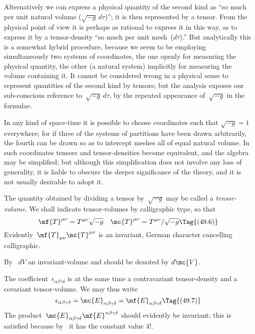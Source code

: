 \documentclass[12pt]{book}
\begin{document}
Alternatively we can express a physical quantity of the second kind as
``so much per unit natural volume ($\sqrt{-g}\, d\tau$)''; it is then represented by a
tensor. From the physical point of view it is perhaps as rational to express
it in this way, as to express it by a tensor\hyp{}density ``so much per unit mesh~($d\tau$).''
But analytically this is a somewhat hybrid procedure, because we seem
to be employing simultaneously two systems of coordinates, the one openly
for measuring the physical quantity, the other (a natural system) implicitly
for measuring the volume containing it. It cannot be considered wrong in a
physical sense to represent quantities of the second kind by tensors; but the
analysis exposes our sub-conscious reference to~$\sqrt{-g}\, d\tau$, by the repeated
appearance of~$\sqrt{-g}$ in the formulae.

In any kind of space-time it is possible to choose coordinates such that
$\sqrt{-g} = 1$ everywhere; for if three of the systems of partitions have been
drawn arbitrarily, the fourth can be drawn so as to intercept meshes all of
equal natural volume. In such coordinates tensors and tensor\hyp{}densities become
equivalent, and the algebra may be simplified; but although this simplification
does not involve any loss of generality, it is liable to obscure the deeper
significance of the theory, and it is not usually desirable to adopt it.

The quantity obtained by dividing a tensor by~$\sqrt{-g}$ may be called a \emph{tensor-volume}.
We shall indicate tensor-volumes by calligraphic type, so that
\[
\mf{T}^{\mu\nu} = T^{\mu\nu}\sqrt{-g} \quad \mc{T}^{\mu\nu} = T^{\mu\nu}/\sqrt{-g}
\Tag{(49.6)}
\]
Evidently~$\mf{T}_{\mu\nu}\mc{T}^{\mu\nu}$ is an invariant, German character cancelling calligraphic.

By~ $dV$ an invariant-volume and should be denoted by $d\mc{V}$.

The coefficient~$\epsilon_{\alpha\beta\gamma\delta}$ is at the same time a contravariant tensor\hyp{}density
and a covariant tensor-volume.
We may thus write
\[
\epsilon_{\alpha\beta\gamma\delta} = \mc{E}_{\alpha\beta\gamma\delta} = \mf{E}_{\alpha\beta\gamma\delta}
\Tag{(49.7)}
\]
The product~$\mc{E}_{\alpha\beta\gamma\delta}\mf{E}^{\alpha\beta\gamma\delta}$ should evidently be invariant;
this is satisfied because by~ it has the constant value $4!$.
\end{document}
